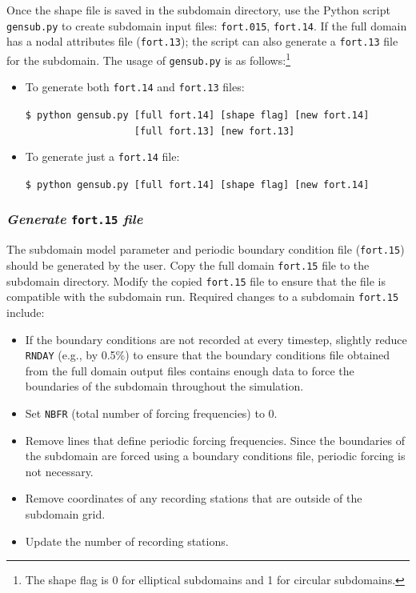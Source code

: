 \documentclass[11pt,titlepage]{article}
\begin{document}
Once the shape file is saved in the subdomain directory, use the
Python script \verb+gensub.py+ to create subdomain input files:
\verb+fort.015+, \verb+fort.14+. If the full domain has a nodal
attributes file (\verb+fort.13+); the script can also generate a
\verb+fort.13+ file for the subdomain. The usage of
\verb+gensub.py+ is as follows:\footnote{The shape flag is 0 for
elliptical subdomains and 1 for circular subdomains.}

\begin{itemize}
\item To generate both \verb+fort.14+ and \verb+fort.13+ files:

\verb+$ python gensub.py [full fort.14] [shape flag] [new fort.14] +\\
\verb+                   [full fort.13] [new fort.13]+

\item To generate just a \verb+fort.14+ file:

\verb+$ python gensub.py [full fort.14] [shape flag] [new fort.14] +
\end{itemize}

\subsubsection*{\emph{Generate} \texttt{fort.15} \emph{file}}

The subdomain model parameter and periodic boundary condition file
(\verb+fort.15+) should be generated by the user. Copy the full domain
\verb+fort.15+ file to the subdomain directory. Modify the copied
\verb+fort.15+ file to ensure that the file is compatible with the
subdomain run. Required changes to a subdomain \verb+fort.15+ include:

\begin{itemize}
\item If the boundary conditions are not recorded at every timestep,
  slightly reduce \texttt{RNDAY} (e.g., by 0.5\%) to ensure that
  the boundary conditions file obtained from the full domain output
  files contains enough data to force the boundaries of the subdomain
  throughout the simulation.
\item Set \texttt{NBFR} (total number of forcing frequencies) to 0.
\item Remove lines that define periodic forcing frequencies. Since the
  boundaries of the subdomain are forced using a boundary conditions
  file, periodic forcing is not necessary.
\item Remove coordinates of any recording stations that are outside of
  the subdomain grid.
\item Update the number of recording stations.
\end{itemize}
\end{document}
